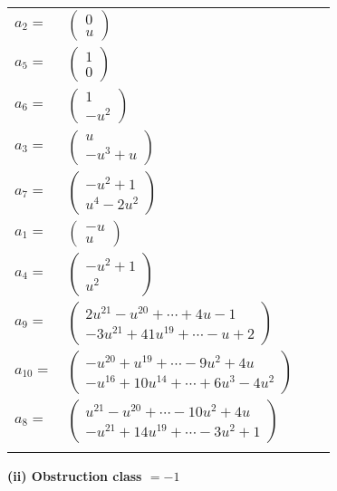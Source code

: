 \documentclass[1p]{elsarticle_modified}
\theoremstyle{definition}
\begin{document}
\begin{tabular}{m{7pt} m{180pt} m{7pt} m{180pt} }
\flushright $a_{2}=$&$\begin{pmatrix}0\\u\end{pmatrix}$ \\
\flushright $a_{5}=$&$\begin{pmatrix}1\\0\end{pmatrix}$ \\
\flushright $a_{6}=$&$\begin{pmatrix}1\\- u^2\end{pmatrix}$ \\
\flushright $a_{3}=$&$\begin{pmatrix}u\\- u^3+u\end{pmatrix}$ \\
\flushright $a_{7}=$&$\begin{pmatrix}- u^2+1\\u^4-2 u^2\end{pmatrix}$ \\
\flushright $a_{1}=$&$\begin{pmatrix}- u\\u\end{pmatrix}$ \\
\flushright $a_{4}=$&$\begin{pmatrix}- u^2+1\\u^2\end{pmatrix}$ \\
\flushright $a_{9}=$&$\begin{pmatrix}2 u^{21}- u^{20}+\cdots+4 u-1\\-3 u^{21}+41 u^{19}+\cdots- u+2\end{pmatrix}$ \\
\flushright $a_{10}=$&$\begin{pmatrix}- u^{20}+u^{19}+\cdots-9 u^2+4 u\\- u^{16}+10 u^{14}+\cdots+6 u^3-4 u^2\end{pmatrix}$ \\
\flushright $a_{8}=$&$\begin{pmatrix}u^{21}- u^{20}+\cdots-10 u^2+4 u\\- u^{21}+14 u^{19}+\cdots-3 u^2+1\end{pmatrix}$\\&\end{tabular}
\flushleft \textbf{(ii) Obstruction class $= -1$}\\~\\
\end{document}
